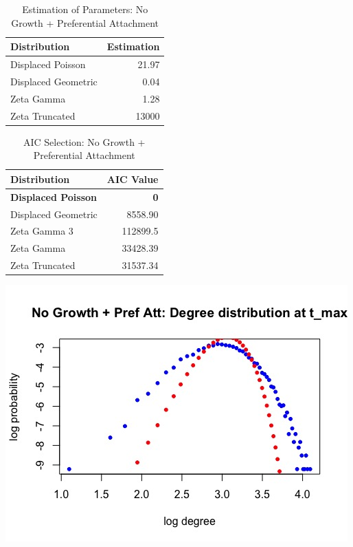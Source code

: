 \documentclass[12pt, a4paper]{article}
\begin{document}
  \begin{table}[H]
      \centering
      \begin{tabular}{l r}
          Distribution & Estimation\\
          \hline
          Displaced Poisson & 21.97\\
          Displaced Geometric & 0.04\\
          Zeta Gamma & 1.28\\ 
          Zeta Truncated & 13000\\
      \end{tabular}
      \caption{Estimation of Parameters: No Growth + Preferential Attachment}
      \label{table:no_grow_pref_att_2}
  \end{table}
  
  \begin{table}[H]
      \centering
      \begin{tabular}{l r}
          Distribution & AIC Value\\
          \hline
          \textbf{Displaced Poisson} & \textbf{0}\\
          Displaced Geometric & 8558.90\\
          Zeta Gamma 3 & 112899.5\\
          Zeta Gamma & 33428.39\\ 
          Zeta Truncated & 31537.34\\
      \end{tabular}
      \caption{AIC Selection: No Growth + Preferential Attachment}
      \label{table:no_grow_pref_att_3}
  \end{table}
  
  \begin{minipage}[t]{\linewidth}
      \includegraphics[width=\textwidth]{degree_tmax_grow_no_pref}
      \captionsetup{type=figure}
      \label{fig:degree_tmax_grow_no_pref}
    \end{minipage}
  
\end{document}
